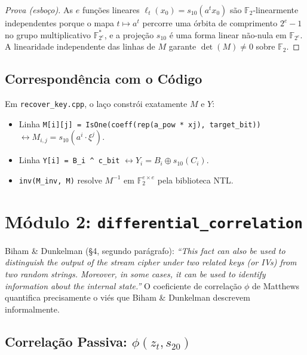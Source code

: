 \documentclass[12pt,a4paper]{article}
\theoremstyle{definition}
\theoremstyle{remark}
\newcommand{\GF}[1]{\mathbb{F}_{2^{#1}}}
\newcommand{\GFtwo}{\mathbb{F}_2}
\newcommand{\xor}{\oplus}
\begin{document}
\begin{proof}[Prova (esboço)]
  As $e$ funções lineares $\ell_t(x_0) = s_{10}(a^t x_0)$ são
  $\GFtwo$-linearmente independentes porque o mapa $t \mapsto a^t$ percorre
  uma órbita de comprimento $2^e - 1$ no grupo multiplicativo $\GF{e}^*$,
  e a projeção $s_{10}$ é uma forma linear não-nula em $\GF{e}$.
  A linearidade independente das linhas de $M$ garante $\det(M) \neq 0$
  sobre $\GFtwo$.
\end{proof}

\subsection{Correspondência com o Código}

Em \texttt{recover\_key.cpp}, o laço constrói exatamente $M$ e $Y$:
\begin{itemize}
  \item Linha \texttt{M[i][j] = IsOne(coeff(rep(a\_pow * xj), target\_bit))}
        $\leftrightarrow M_{i,j} = s_{10}(a^i \cdot \xi^j)$.
  \item Linha \texttt{Y[i] = B\_i \^{} c\_bit} $\leftrightarrow Y_i = B_i \xor s_{10}(C_i)$.
  \item \texttt{inv(M\_inv, M)} resolve $M^{-1}$ em $\GFtwo^{e\times e}$ pela biblioteca NTL.
\end{itemize}

\section{Módulo 2: \texttt{differential\_correlation}}
\label{sec:corr}

\begin{paperref}
  Biham \& Dunkelman (\S4, segundo parágrafo): \textit{``This fact can also
  be used to distinguish the output of the stream cipher under two related
  keys (or IVs) from two random strings. Moreover, in some cases, it can be
  used to identify information about the internal state.''}
  O coeficiente de correlação $\phi$ de Matthews quantifica precisamente o
  viés que Biham \& Dunkelman descrevem informalmente.
\end{paperref}

\subsection{Correlação Passiva: $\phi(z_t, s_{20})$}
\end{document}
